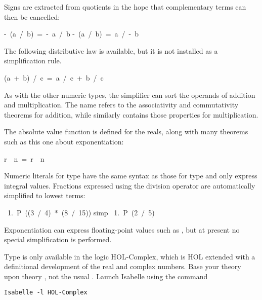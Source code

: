 Signs are extracted from quotients in the hope that complementary terms can
then be cancelled:
\begin{isabelle}
-\ (a\ /\ b)\ =\ -\ a\ /\ b
\isanewline
-\ (a\ /\ b)\ =\ a\ /\ -\ b
\end{isabelle}

The following distributive law is available, but it is not installed as a
simplification rule.
\begin{isabelle}
(a\ +\ b)\ /\ c\ =\ a\ /\ c\ +\ b\ /\ c%
\end{isabelle}

As with the other numeric types, the simplifier can sort the operands of
addition and multiplication.  The name  refers to the
associativity and commutativity theorems for addition, while similarly
 contains those properties for multiplication. 

The absolute value function  is
defined for the reals, along with many theorems such as this one about
exponentiation:
\begin{isabelle}
\isasymbar r\ \isacharcircum \ n\isasymbar\ =\ 
\isasymbar r\isasymbar \ \isacharcircum \ n
\end{isabelle}

Numeric literals
for type \isa{real} have the same syntax as those for type
 and only express integral values.  Fractions expressed
using the division operator are automatically simplified to lowest terms:
\begin{isabelle}
\ 1.\ P\ ((3\ /\ 4)\ *\ (8\ /\ 15))\isanewline
{} simp\isanewline
\ 1.\ P\ (2\ /\ 5)
\end{isabelle}
Exponentiation can express floating-point values such as
, but at present no special simplification
is performed.


\begin{warn}
Type  is only available in the logic HOL-Complex, which
is  HOL extended with a definitional development of the real and complex
numbers.  Base your theory upon theory
, not the usual .%
Launch Isabelle using the command 
\begin{verbatim}
Isabelle -l HOL-Complex
\end{verbatim}
\end{warn}

